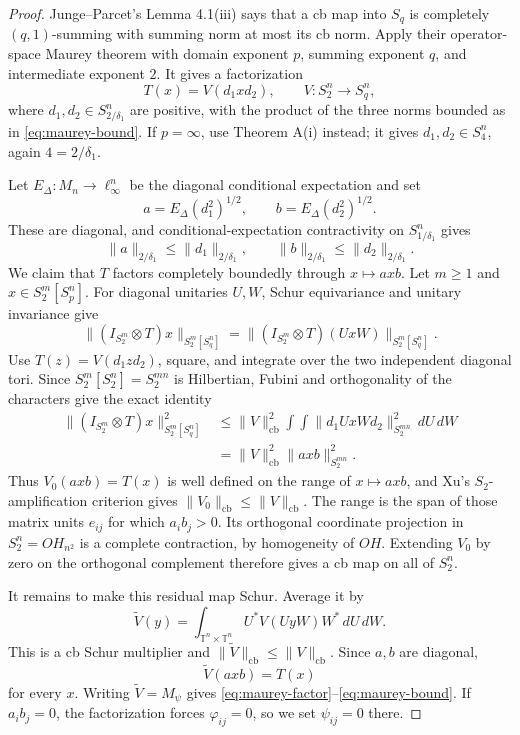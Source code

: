 \documentclass[11pt]{article}
\newcommand{\cb}{\mathrm{cb}}
\begin{document}
\begin{proof}
Junge--Parcet's Lemma 4.1(iii) says that a cb map into $S_q$ is completely
$(q,1)$-summing with summing norm at most its cb norm.  Apply their
operator-space Maurey theorem \cite[Theorem A(iii)]{JungeParcet} with domain
exponent $p$, summing exponent $q$, and intermediate exponent $2$.  It gives
a factorization
\[
 T(x)=V(d_1xd_2),\qquad V:S_2^n\to S_q^n,
\]
where $d_1,d_2\in S_{2/\delta_1}^n$ are positive, with the product of the
three norms bounded as in \eqref{eq:maurey-bound}.  If $p=\infty$, use
Theorem A(i) instead; it gives $d_1,d_2\in S_4^n$, again
$4=2/\delta_1$.

Let $E_\Delta:M_n\to\ell_\infty^n$ be the diagonal conditional expectation
and set
\[
 a=E_\Delta(d_1^2)^{1/2},\qquad
 b=E_\Delta(d_2^2)^{1/2}.
\]
These are diagonal, and conditional-expectation contractivity on
$S_{1/\delta_1}^n$ gives
\[
 \|a\|_{2/\delta_1}\le\|d_1\|_{2/\delta_1},\qquad
 \|b\|_{2/\delta_1}\le\|d_2\|_{2/\delta_1}.
\]
We claim that $T$ factors completely boundedly through $x\mapsto axb$.
Let $m\ge1$ and $x\in S_2^m[S_p^n]$.  For diagonal unitaries $U,W$, Schur
equivariance and unitary invariance give
\[
 \|(I_{S_2^m}\otimes T)x\|_{S_2^m[S_q^n]}
 =\|(I_{S_2^m}\otimes T)(UxW)\|_{S_2^m[S_q^n]}.
\]
Use $T(z)=V(d_1zd_2)$, square, and integrate over the two independent
diagonal tori.  Since
$S_2^m[S_2^n]=S_2^{mn}$ is Hilbertian, Fubini and orthogonality of the
characters give the exact identity
\begin{align*}
 \|(I_{S_2^m}\otimes T)x\|_{S_2^m[S_q^n]}^2
 &\le \|V\|_{\cb}^2
 \int\!\int\|d_1UxWd_2\|_{S_2^{mn}}^2\,dU\,dW\\
 &=\|V\|_{\cb}^2\|axb\|_{S_2^{mn}}^2.
\end{align*}
Thus $V_0(axb)=T(x)$ is well defined on the range of
$x\mapsto axb$, and Xu's $S_2$-amplification criterion
\cite[Lemma 1.1]{Xu} gives $\|V_0\|_{\cb}\le\|V\|_{\cb}$.  The range is
the span of those matrix units $e_{ij}$ for which $a_i b_j>0$.  Its
orthogonal coordinate projection in $S_2^n=OH_{n^2}$ is a complete
contraction, by homogeneity of $OH$.  Extending $V_0$ by zero on the
orthogonal complement therefore gives a cb map on all of $S_2^n$.

It remains to make this residual map Schur.  Average it by
\[
 \widetilde V(y)=\int_{\mathbb T^n\times\mathbb T^n}
 U^*V(UyW)W^*\,dU\,dW.
\]
This is a cb Schur multiplier and $\|\widetilde V\|_{\cb}\le\|V\|_{\cb}$.
Since $a,b$ are diagonal,
\[
 \widetilde V(axb)=T(x)
\]
for every $x$.  Writing $\widetilde V=M_\psi$ gives
\eqref{eq:maurey-factor}--\eqref{eq:maurey-bound}.  If $a_i b_j=0$, the
factorization forces $\varphi_{ij}=0$, so we set $\psi_{ij}=0$ there.
\end{proof}
\end{document}
